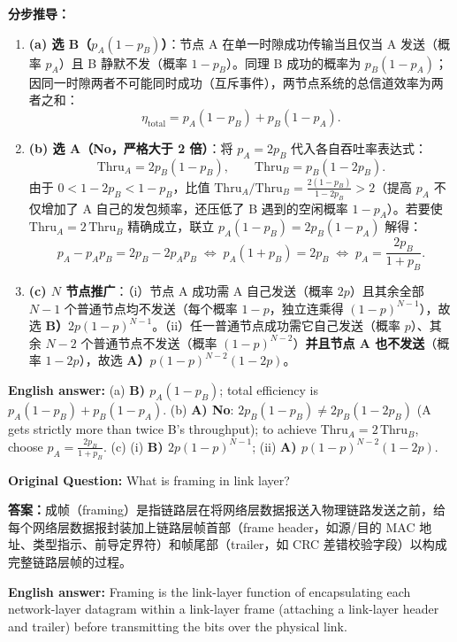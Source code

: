 \textbf{分步推导：}
\begin{enumerate}
\item \textbf{(a) 选 B（$p_A(1 - p_B)$）}：节点 A 在单一时隙成功传输当且仅当 A 发送（概率 $p_A$）且 B 静默不发（概率 $1 - p_B$）。同理 B 成功的概率为 $p_B(1 - p_A)$；因同一时隙两者不可能同时成功（互斥事件），两节点系统的总信道效率为两者之和：
\[
\eta_{\mathrm{total}} = p_A(1 - p_B) + p_B(1 - p_A).
\tag{T11.1}
\]
\item \textbf{(b) 选 A（No，严格大于 2 倍）}：将 $p_A = 2 p_B$ 代入各自吞吐率表达式：
\[
\mathrm{Thru}_A = 2 p_B(1 - p_B), \qquad \mathrm{Thru}_B = p_B(1 - 2 p_B).
\tag{T11.2}
\]
由于 $0 < 1 - 2p_B < 1 - p_B$，比值 $\mathrm{Thru}_A / \mathrm{Thru}_B = \frac{2(1-p_B)}{1-2p_B} > 2$（提高 $p_A$ 不仅增加了 A 自己的发包频率，还压低了 B 遇到的空闲概率 $1-p_A$）。若要使 $\mathrm{Thru}_A = 2\,\mathrm{Thru}_B$ 精确成立，联立 $p_A(1 - p_B) = 2 p_B(1 - p_A)$ 解得：
\[
p_A - p_A p_B = 2 p_B - 2 p_A p_B
\;\Longleftrightarrow\;
p_A(1 + p_B) = 2 p_B
\;\Longleftrightarrow\;
p_A = \frac{2 p_B}{1 + p_B}.
\tag{T11.3}
\]
\item \textbf{(c) $N$ 节点推广}：（i）节点 A 成功需 A 自己发送（概率 $2p$）且其余全部 $N-1$ 个普通节点均不发送（每个概率 $1-p$，独立连乘得 $(1-p)^{N-1}$），故选 \textbf{B）$2p(1-p)^{N-1}$}。（ii）任一普通节点成功需它自己发送（概率 $p$）、其余 $N-2$ 个普通节点不发送（概率 $(1-p)^{N-2}$）\textbf{并且节点 A 也不发送}（概率 $1 - 2p$），故选 \textbf{A）$p(1-p)^{N-2}(1-2p)$}。
\end{enumerate}

\textbf{English answer:} (a) \textbf{B) $p_A(1-p_B)$}; total efficiency is $p_A(1-p_B) + p_B(1-p_A)$. (b) \textbf{A) No}: $2p_B(1-p_B) \neq 2 p_B(1-2p_B)$ (A gets strictly more than twice B's throughput); to achieve $\mathrm{Thru}_A = 2\,\mathrm{Thru}_B$, choose $p_A = \frac{2p_B}{1+p_B}$. (c) (i) \textbf{B) $2p(1-p)^{N-1}$}; (ii) \textbf{A) $p(1-p)^{N-2}(1-2p)$}.



\textbf{Original Question:} What is framing in link layer?

\textbf{答案：}成帧（framing）是指链路层在将网络层数据报送入物理链路发送之前，给每个网络层数据报封装加上链路层帧首部（frame header，如源/目的 MAC 地址、类型指示、前导定界符）和帧尾部（trailer，如 CRC 差错校验字段）以构成完整链路层帧的过程。

\textbf{English answer:} Framing is the link-layer function of encapsulating each network-layer datagram within a link-layer frame (attaching a link-layer header and trailer) before transmitting the bits over the physical link.

